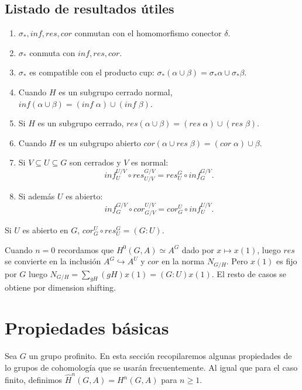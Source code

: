 \documentclass[a4paper,12pt, leqno]{article}
\begin{document}
	\subsection{Listado de resultados útiles}
	\begin{enumerate}
		\item $\sigma_*,inf,res,cor$ conmutan con el homomorfismo conector $\delta$.
		\item  $\sigma_*$ conmuta con $inf,res,cor$.
		\item $\sigma_*$ es compatible con el producto cup: $\sigma_*(\alpha \cup \beta)= \sigma_* \alpha \cup \sigma_* \beta$.
		\item Cuando $H$ es un subgrupo cerrado normal, $inf(\alpha \cup \beta)=(inf\;\alpha)\cup (inf\; \beta)$.
		\item Si $H$ es un subgrupo cerrado, $res(\alpha \cup \beta)=(res\;\alpha)\cup (res\; \beta)$.
		\item Cuando $H$ es un subgrupo abierto $cor(\alpha \cup res\; \beta)=(cor\; \alpha)\cup \beta$.
		\item  Si $V \subseteq U \subseteq G$ son cerrados y $V$ es normal:
		\begin{equation*}
		inf^{U/V}_U \circ res^{G/V}_{U/V} = res^G_U \circ inf ^{G/V}_G.
		\end{equation*}
		\item Si además $U$ es abierto:
		\begin{equation*}
		inf^{G/V}_G \circ cor^{U/V}_{G/V} = cor^U_G \circ inf^{U/V}_U.
		\end{equation*}
	\end{enumerate}
\begin{prop}
	Si $U$ es abierto en $G$, $cor^U_G \circ res^G_U=(G:U)$.
\end{prop}
\begin{dem}
	Cuando $n=0$ recordamos que $H^0(G,A)\simeq A^G$ dado por $x\mapsto x(1)$, luego $res$ se convierte en la inclusión $A^G \hookrightarrow A^U$ y $cor$ en la norma $N_{G/H}$. Pero $x(1)$ es fijo por $G$ luego $N_{G/H}=\sum_{gH}(gH)x(1)=(G:U)x(1)$. El resto de casos se obtiene por dimension shifting. 
\end{dem}
	\section{Propiedades básicas}
	Sea $G$ un grupo profinito. En esta sección recopilaremos algunas propiedades de lo grupos de cohomología que se usarán frecuentemente. Al igual que para el caso finito, definimos $\hat{H}^n(G,A)=H^n(G,A)$ para $n\geq 1$.
	
\end{document}
